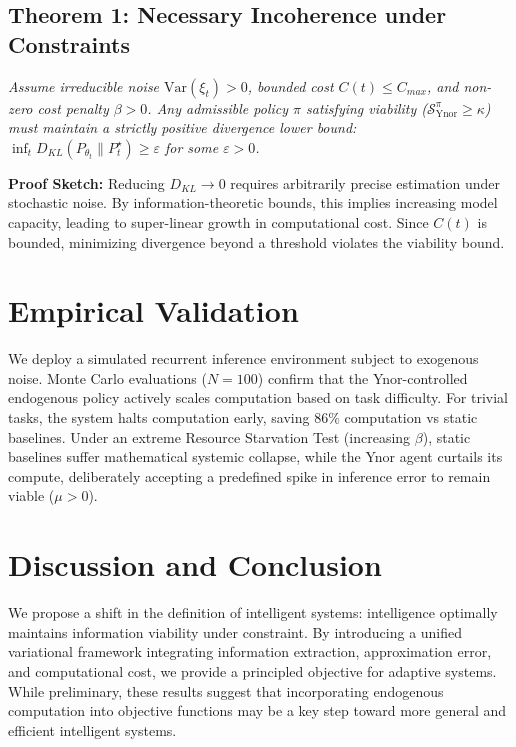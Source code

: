 \documentclass{article}
\begin{document}
\subsection{Theorem 1: Necessary Incoherence under Constraints}
\textit{Assume irreducible noise $\mathrm{Var}(\xi_t) > 0$, bounded cost $C(t) \le C_{max}$, and non-zero cost penalty $\beta > 0$. Any admissible policy $\pi$ satisfying viability ($\mathcal{S}_{\text{Ynor}}^\pi \ge \kappa$) must maintain a strictly positive divergence lower bound: $\inf_t D_{KL}(P_{\theta_t} \parallel P_t^\star) \ge \varepsilon$ for some $\varepsilon > 0$.}

\textbf{Proof Sketch:} Reducing $D_{KL} \to 0$ requires arbitrarily precise estimation under stochastic noise. By information-theoretic bounds, this implies increasing model capacity, leading to super-linear growth in computational cost. Since $C(t)$ is bounded, minimizing divergence beyond a threshold violates the viability bound.

\section{Empirical Validation}
We deploy a simulated recurrent inference environment subject to exogenous noise. Monte Carlo evaluations ($N=100$) confirm that the Ynor-controlled endogenous policy actively scales computation based on task difficulty. 
For trivial tasks, the system halts computation early, saving $86\%$ computation vs static baselines. Under an extreme Resource Starvation Test (increasing $\beta$), static baselines suffer mathematical systemic collapse, while the Ynor agent curtails its compute, deliberately accepting a predefined spike in inference error to remain viable ($\mu > 0$).

\section{Discussion and Conclusion}
We propose a shift in the definition of intelligent systems: intelligence optimally maintains information viability under constraint. By introducing a unified variational framework integrating information extraction, approximation error, and computational cost, we provide a principled objective for adaptive systems.
While preliminary, these results suggest that incorporating endogenous computation into objective functions may be a key step toward more general and efficient intelligent systems.
\end{document}
